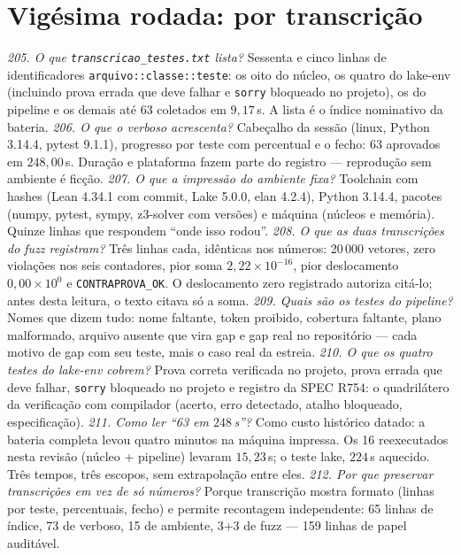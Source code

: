 \section{Vigésima rodada: por transcrição}
\textit{205. O que \texttt{transcricao\_testes.txt} lista?} Sessenta e cinco linhas de identificadores \texttt{arquivo::classe::teste}: os oito do núcleo, os quatro do lake-env (incluindo prova errada que deve falhar e \texttt{sorry} bloqueado no projeto), os do pipeline e os demais até 63 coletados em $9{,}17$\,s. A lista é o índice nominativo da bateria.
\textit{206. O que o verboso acrescenta?} Cabeçalho da sessão (linux, Python 3.14.4, pytest 9.1.1), progresso por teste com percentual e o fecho: 63 aprovados em $248{,}00$\,s. Duração e plataforma fazem parte do registro --- reprodução sem ambiente é ficção.
\textit{207. O que a impressão do ambiente fixa?} Toolchain com hashes (Lean 4.34.1 com commit, Lake 5.0.0, elan 4.2.4), Python 3.14.4, pacotes (numpy, pytest, sympy, z3-solver com versões) e máquina (núcleos e memória). Quinze linhas que respondem ``onde isso rodou''.
\textit{208. O que as duas transcrições do fuzz registram?} Três linhas cada, idênticas nos números: 20\,000 vetores, zero violações nos seis contadores, pior soma $2{,}22\times10^{-16}$, pior deslocamento $0{,}00\times10^{0}$ e \texttt{CONTRAPROVA\_OK}. O deslocamento zero registrado autoriza citá-lo; antes desta leitura, o texto citava só a soma.
\textit{209. Quais são os testes do pipeline?} Nomes que dizem tudo: nome faltante, token proibido, cobertura faltante, plano malformado, arquivo ausente que vira gap e gap real no repositório --- cada motivo de gap com seu teste, mais o caso real da estreia.
\textit{210. O que os quatro testes do lake-env cobrem?} Prova correta verificada no projeto, prova errada que deve falhar, \texttt{sorry} bloqueado no projeto e registro da SPEC R754: o quadrilátero da verificação com compilador (acerto, erro detectado, atalho bloqueado, especificação).
\textit{211. Como ler ``63 em $248$\,s''?} Como custo histórico datado: a bateria completa levou quatro minutos na máquina impressa. Os 16 reexecutados nesta revisão (núcleo + pipeline) levaram $15{,}23$\,s; o teste lake, $224$\,s aquecido. Três tempos, três escopos, sem extrapolação entre eles.
\textit{212. Por que preservar transcrições em vez de só números?} Porque transcrição mostra formato (linhas por teste, percentuais, fecho) e permite recontagem independente: 65 linhas de índice, 73 de verboso, 15 de ambiente, 3+3 de fuzz --- 159 linhas de papel auditável.
